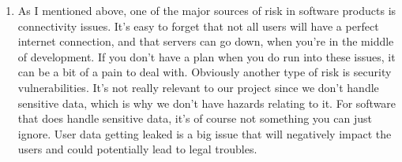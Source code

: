 \documentclass{article}
\begin{document}
\begin{enumerate}
    \item As I mentioned above, one of the major sources of risk in software products is connectivity issues.
    It's easy to forget that not all users will have a perfect internet connection, and that servers can go down, when you're in the middle of development.
    If you don't have a plan when you do run into these issues, it can be a bit of a pain to deal with.
    Obviously another type of risk is security vulnerabilities.
    It's not really relevant to our project since we don't handle sensitive data, which is why we don't have hazards relating to it.
    For software that does handle sensitive data, it's of course not something you can just ignore.
    User data getting leaked is a big issue that will negatively impact the users and could potentially lead to legal troubles.
\end{enumerate}
\end{document}
